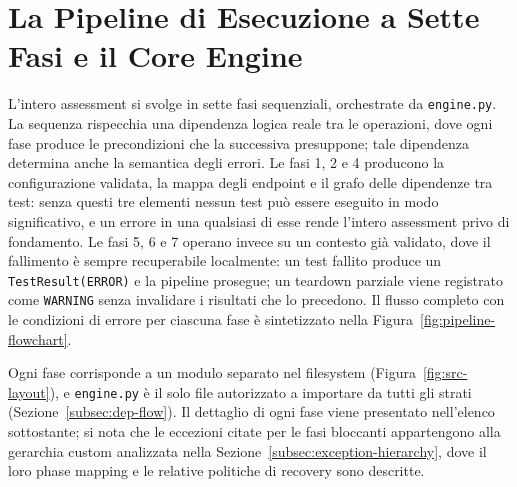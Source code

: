 \section{La Pipeline di Esecuzione a Sette Fasi e il Core Engine}%
\label{sec:pipeline}

L'intero assessment si svolge in sette fasi sequenziali, orchestrate da \texttt{engine.py}. La sequenza rispecchia una dipendenza logica reale tra le operazioni, dove ogni fase produce le precondizioni che la successiva presuppone; tale dipendenza determina anche la semantica degli errori. Le fasi 1, 2 e 4 producono la configurazione validata, la mappa degli endpoint e il grafo delle dipendenze tra test: senza questi tre elementi nessun test può essere eseguito in modo significativo, e un errore in una qualsiasi di esse rende l'intero assessment privo di fondamento. Le fasi 5, 6 e 7 operano invece su un contesto già validato, dove il fallimento è sempre recuperabile localmente: un test fallito produce un \texttt{TestResult(ERROR)} e la pipeline prosegue; un teardown parziale viene registrato come \texttt{WARNING} senza invalidare i risultati che lo precedono. Il flusso completo con le condizioni di errore per ciascuna fase è sintetizzato nella Figura~\ref{fig:pipeline-flowchart}.



Ogni fase corrisponde a un modulo separato nel filesystem (Figura~\ref{fig:src-layout}), e \texttt{engine.py} è il solo file autorizzato a importare da tutti gli strati (Sezione~\ref{subsec:dep-flow}). Il dettaglio di ogni fase viene presentato nell'elenco sottostante; si nota che le eccezioni citate per le fasi bloccanti appartengono alla gerarchia custom analizzata nella Sezione~\ref{subsec:exception-hierarchy}, dove il loro phase mapping e le relative politiche di recovery sono descritte.



